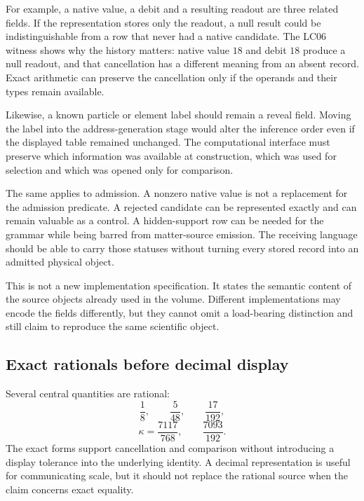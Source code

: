 For example, a native value, a debit and a resulting readout are three related fields. If the representation stores only the readout, a null result could be indistinguishable from a row that never had a native candidate. The LC06 witness shows why the history matters: native value $18$ and debit $18$ produce a null readout, and that cancellation has a different meaning from an absent record. Exact arithmetic can preserve the cancellation only if the operands and their types remain available.

Likewise, a known particle or element label should remain a reveal field. Moving the label into the address-generation stage would alter the inference order even if the displayed table remained unchanged. The computational interface must preserve which information was available at construction, which was used for selection and which was opened only for comparison.

The same applies to admission. A nonzero native value is not a replacement for the admission predicate. A rejected candidate can be represented exactly and can remain valuable as a control. A hidden-support row can be needed for the grammar while being barred from matter-source emission. The receiving language should be able to carry those statuses without turning every stored record into an admitted physical object.

This is not a new implementation specification. It states the semantic content of the source objects already used in the volume. Different implementations may encode the fields differently, but they cannot omit a load-bearing distinction and still claim to reproduce the same scientific object.

\subsection{Exact rationals before decimal display}

Several central quantities are rational:
\begin{equation}
\frac18,\qquad\frac5{48},\qquad\frac{17}{192},
\end{equation}
\begin{equation}
\kappa=\frac{7117}{768},\qquad
\frac{7093}{192}.
\end{equation}
The exact forms support cancellation and comparison without introducing a display tolerance into the underlying identity. A decimal representation is useful for communicating scale, but it should not replace the rational source when the claim concerns exact equality.

